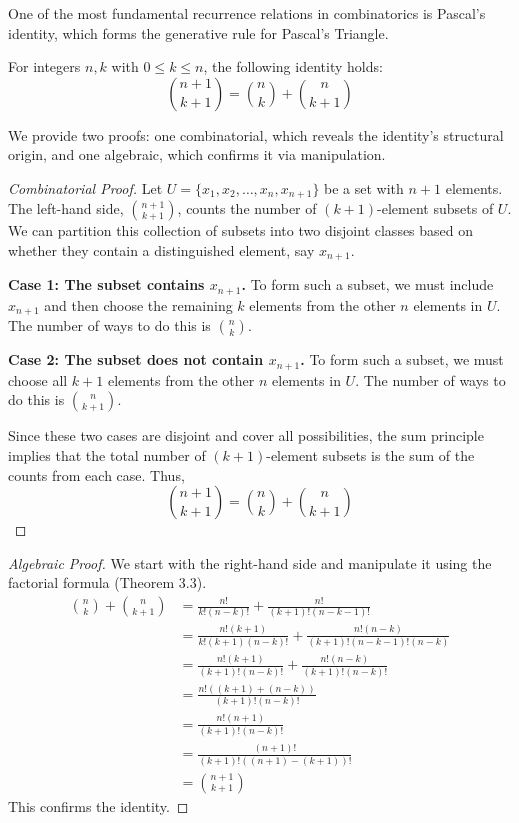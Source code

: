 One of the most fundamental recurrence relations in combinatorics is Pascal's identity, which forms the generative rule for Pascal's Triangle.

\begin{theorem}\label{thm:pascals_identity}
For integers $n, k$ with $0 \le k \le n$, the following identity holds:
$$ \binom{n+1}{k+1} = \binom{n}{k} + \binom{n}{k+1} $$
\end{theorem}

We provide two proofs: one combinatorial, which reveals the identity's structural origin, and one algebraic, which confirms it via manipulation.

\begin{proof}[Combinatorial Proof]
Let $U = \{x_1, x_2, \dots, x_n, x_{n+1}\}$ be a set with $n+1$ elements. The left-hand side, $\binom{n+1}{k+1}$, counts the number of $(k+1)$-element subsets of $U$. We can partition this collection of subsets into two disjoint classes based on whether they contain a distinguished element, say $x_{n+1}$.

\textbf{Case 1: The subset contains $x_{n+1}$.}
To form such a subset, we must include $x_{n+1}$ and then choose the remaining $k$ elements from the other $n$ elements in $U$. The number of ways to do this is $\binom{n}{k}$.

\textbf{Case 2: The subset does not contain $x_{n+1}$.}
To form such a subset, we must choose all $k+1$ elements from the other $n$ elements in $U$. The number of ways to do this is $\binom{n}{k+1}$.

Since these two cases are disjoint and cover all possibilities, the sum principle implies that the total number of $(k+1)$-element subsets is the sum of the counts from each case. Thus,
$$ \binom{n+1}{k+1} = \binom{n}{k} + \binom{n}{k+1} $$
\end{proof}

\begin{proof}[Algebraic Proof]
We start with the right-hand side and manipulate it using the factorial formula (Theorem 3.3).
\begin{align*}
\binom{n}{k} + \binom{n}{k+1} &= \frac{n!}{k!(n-k)!} + \frac{n!}{(k+1)!(n-k-1)!} \\
&= \frac{n!(k+1)}{k!(k+1)(n-k)!} + \frac{n!(n-k)}{(k+1)!(n-k-1)!(n-k)} \\
&= \frac{n!(k+1)}{(k+1)!(n-k)!} + \frac{n!(n-k)}{(k+1)!(n-k)!} \\
&= \frac{n!((k+1) + (n-k))}{(k+1)!(n-k)!} \\
&= \frac{n!(n+1)}{(k+1)!(n-k)!} \\
&= \frac{(n+1)!}{(k+1)!((n+1)-(k+1))!} \\
&= \binom{n+1}{k+1}
\end{align*}
This confirms the identity.
\end{proof}

